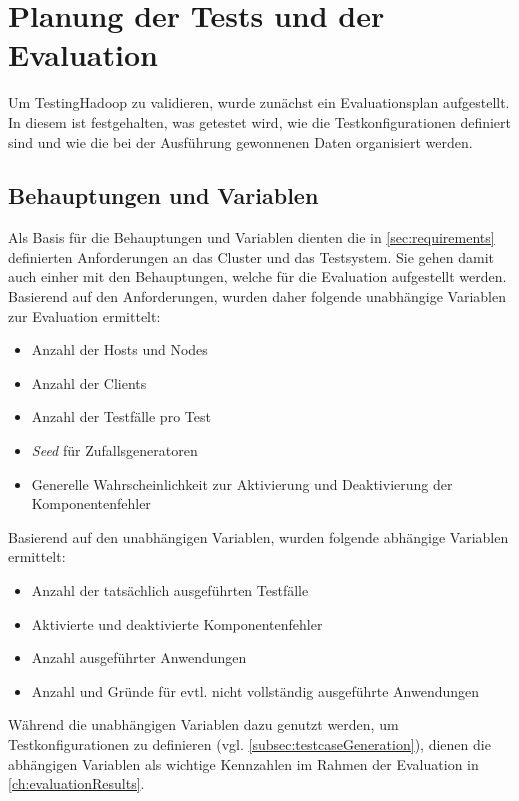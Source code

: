 \section{Planung der Tests und der Evaluation}
\label{sec:evaluationPlan}

Um TestingHadoop zu validieren, wurde zunächst ein Evaluationsplan aufgestellt.
In diesem ist festgehalten, was getestet wird, wie die Testkonfigurationen definiert sind und wie die bei der Ausführung gewonnenen Daten organisiert werden.

\subsection{Behauptungen und Variablen}
\label{subsec:theses}

Als Basis für die Behauptungen und Variablen dienten die in \cref{sec:requirements} definierten Anforderungen an das Cluster und das Testsystem.
Sie gehen damit auch einher mit den Behauptungen, welche für die Evaluation aufgestellt werden.
Basierend auf den Anforderungen, wurden daher folgende unabhängige Variablen zur Evaluation ermittelt:

\begin{itemize}
    \item Anzahl der Hosts und Nodes
    \item Anzahl der Clients
    \item Anzahl der Testfälle pro Test
    \item \emph{Seed} für Zufallsgeneratoren
    \item Generelle Wahrscheinlichkeit zur Aktivierung und Deaktivierung der Komponentenfehler
\end{itemize}

Basierend auf den unabhängigen Variablen, wurden \uA folgende abhängige Variablen ermittelt:

\begin{itemize}
    \item Anzahl der tatsächlich ausgeführten Testfälle
    \item Aktivierte und deaktivierte Komponentenfehler
    \item Anzahl ausgeführter Anwendungen
    \item Anzahl und Gründe für evtl. nicht vollständig ausgeführte Anwendungen
\end{itemize}

Während die unabhängigen Variablen dazu genutzt werden, um Testkonfigurationen zu definieren (vgl. \cref{subsec:testcaseGeneration}), dienen die abhängigen Variablen als wichtige Kennzahlen im Rahmen der Evaluation in \cref{ch:evaluationResults}.

